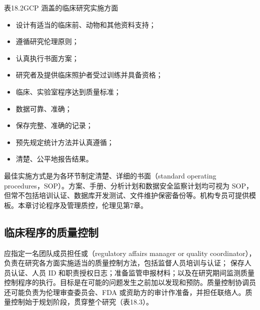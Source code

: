 \begin{bookbox}{表18.2\quad GCP 涵盖的临床研究实施方面}
\begin{itemize}
\item 设计有适当的临床前、动物和其他资料支持；
\item 遵循研究伦理原则；
\item 认真执行书面方案；
\item 研究者及提供临床照护者受过训练并具备资格；
\item 临床、实验室程序达到质量标准；
\item 数据可靠、准确；
\item 保存完整、准确的记录；
\item 预先规定统计方法并认真遵循；
\item 清楚、公平地报告结果。
\end{itemize}
\end{bookbox}
最佳实施方式是为各环节制定清楚、详细的书面（standard operating procedures，SOP）。方案、手册、分析计划和数据安全监察计划均可视为 SOP，但常不包括培训认证、数据库开发测试、文件维护保密备份等。机构专员可提供模板。本章讨论程序及管理质控，伦理见第7章。

\subsection{临床程序的质量控制}
应指定一名团队成员担任或（regulatory affairs manager or quality coordinator），负责在研究各方面实施适当的质量控制方法，包括监督人员培训与认证；
保存人员认证、人员 ID 和职责授权日志；准备监管申报材料；以及在研究期间监测质量控制程序的执行。目标是在可能的问题发生之前加以发现和预防。质量控制协调员还可能负责为伦理审查委员会、FDA 或资助方的审计作准备，并担任联络人。质量控制始于规划阶段，贯穿整个研究（表18.3）。

